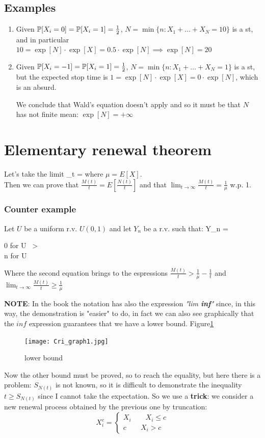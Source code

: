 \subsection{Examples}
	\begin{enumerate}
		\item Given $\mathbb{P}[X_i=0]=\mathbb{P}[X_i = 1] = \frac{1}{2}$, $N = \min\{n : X_1 + \dots + X_N =10\}$ is a \gls{st}, and in particular
		$10 = \exp[N] \cdot \exp[X] = 0.5 \cdot \exp[N] \implies \exp[N]=20$
		\item Given $\mathbb{P}[X_i=-1]=\mathbb{P}[X_i = 1] = \frac{1}{2}$, $N = \min\{n : X_1 + \dots + X_N =1\}$ is a \gls{st}, but the expected stop time
		is $1 = \exp[N] \cdot \exp[X] = 0 \cdot \exp[N] $, which is an absurd.

		We conclude that Wald's equation doesn't apply and so it must be that $N$ has not finite mean: $\exp[N]=+\infty$
	\end{enumerate}

	\section{Elementary renewal theorem}
	Let's take the limit
	\beq
	\lim_{t \to \infty} = 
	\eeq
	where $\mu = E[X]$.\\
	Then we can prove that $\frac{M(t)}{t} = E[\frac{N(t)}{t}]$ and that $\lim_{t \to \infty}\frac{M(t)}{t} = \frac{1}{\mu}$ w.p. 1.
	\subsubsection{Counter example}
	Let $U$ be a uniform r.v. $U(0,1)$ and let $Y_n$ be a r.v. such that:
	\beq
	Y_n =
	\begin{cases}
	0 \quad for \quad U \ > \\
	n \quad for \quad U \leq {}
	\end{cases}
	\eeq
	Where the second equation brings to the espressions $\frac{M(t)}{t} > \frac{1}{\mu} - \frac{1}{t}$ and $\lim_{t \to \infty} \frac{M(t)}{t} \geq \frac{1}{\mu}$

	\textbf{NOTE}: In the book the notation has also the expression \textit{"lim \textbf{inf}"} since, in this way, the demonstration is "easier" to do, in fact we can also see graphically that the $inf$ expression guarantees that we have a lower bound. Figure\ref{fig:graph1}
	\begin{figure}[h]
	\centering
	\texttt{[image: Cri\_graph1.jpg]}
	\caption{lower bound}
	\label{fig:graph1}
	\end{figure}
	Now the other bound must be proved, so to reach the equality, but here there is a problem: $S_{N(t)}$ is not known, so it is difficult to demonstrate the inequality $t \geq S_{N(t)}$ since I cannot take the expectation. So we use a \textbf{trick}: we consider a new renewal process obtained by the previous one by truncation:
	\begin{equation}
	X_i^c =
	\begin{cases}
	X_i \qquad X_i \leq c\\
	c \qquad X_i >c
	\end{cases}
	\end{equation}

